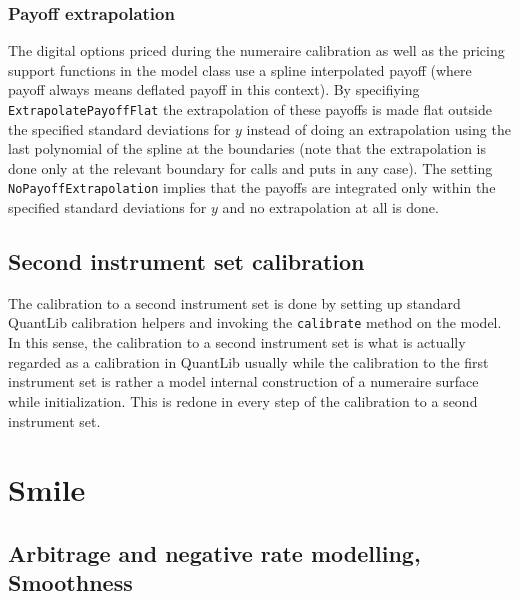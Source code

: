 \documentclass{amsart}
\theoremstyle{plain}
\numberwithin{equation}{section}
\begin{document}
\subsubsection{Payoff extrapolation}\label{AdjusterPayoffExtrapolation}
The digital options priced during the numeraire calibration as well as the pricing support functions in the model class use a spline interpolated payoff (where payoff always means deflated payoff in this context). By specifiying \verb+ExtrapolatePayoffFlat+ the extrapolation of these payoffs is made flat outside the specified standard deviations for $y$ instead of doing an extrapolation using the last polynomial of the spline at the boundaries (note that the extrapolation is done only at the relevant boundary for calls and puts in any case).  The setting \verb+NoPayoffExtrapolation+ implies that the payoffs are integrated only within the specified standard deviations for $y$ and no extrapolation at all is done.

\subsection{Second instrument set calibration}
The calibration to a second instrument set is done by setting up standard QuantLib calibration helpers and invoking the \verb+calibrate+ method
on the model. In this sense, the calibration to a second instrument set is what is actually regarded as a calibration in QuantLib usually while the
calibration to the first instrument set is rather a model internal construction of a numeraire surface while initialization. This is redone in every
step of the calibration to a seond instrument set.

\section{Smile}

\subsection{Arbitrage and negative rate modelling, Smoothness}
\end{document}
